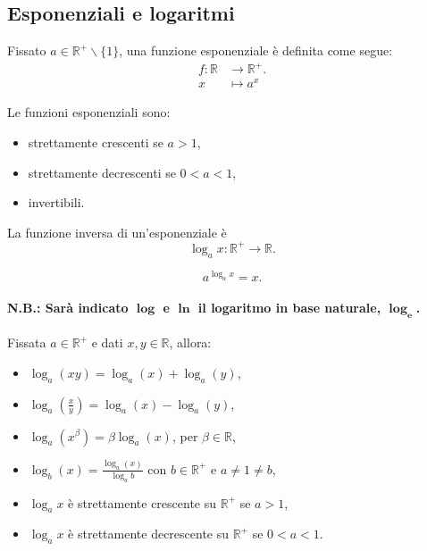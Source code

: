 \subsection{Esponenziali e logaritmi}
\begin{definition}[Esponenziale]\label{def:funzione_esponenziale}
    Fissato $a\in\mathbb R^+\backslash\{1\}$, una funzione esponenziale è definita come segue:
    \begin{align*}
        f \colon  \mathbb R & \rightarrow\mathbb R^+.\\
        x & \mapsto a^x
    \end{align*}
\end{definition}

\begin{property}
    Le funzioni esponenziali sono:
    \begin{itemize}
        \item strettamente crescenti se $a > 1$,
        \item strettamente decrescenti se $0<a<1$,
        \item invertibili.
    \end{itemize}
\end{property}

\begin{definition}[Logaritmo]
    La funzione inversa di un'esponenziale è
    \begin{equation*}
        \log_ax\colon \mathbb R^+\rightarrow \mathbb R.
    \end{equation*}
\end{definition}

\begin{property}
    \begin{equation*}
        a^{\log_ax}=x.
    \end{equation*}
\end{property}

\paragraph{N.B.: Sarà indicato $\boldsymbol\log$ e $\boldsymbol\ln$ il logaritmo in base naturale, $\boldsymbol{\log_e}$.}

\begin{property}
Fissata $a\in\mathbb R^+$ e dati $x,y\in\mathbb R$, allora:
    \begin{itemize}
        \item $\log_a(xy)=\log_a(x)+\log_a(y)$,
        \item $\log_a\left(\frac{x}{y}\right)=\log_a(x)-\log_a(y)$,
        \item $\log_a\left(x^\beta\right)=\beta\log_a(x)$, per $\beta\in\mathbb R$,
        \item $\log_b(x)=\frac{\log_a(x)}{\log_a b}$ con $b\in\mathbb R^+$ e $a\neq1\neq b$,
        \item $\log_a x$ è strettamente crescente su $\mathbb R^+$ se $a>1$,
        \item $\log_a x$ è strettamente decrescente su $\mathbb R^+$ se $0<a<1$.
    \end{itemize}
\end{property}

